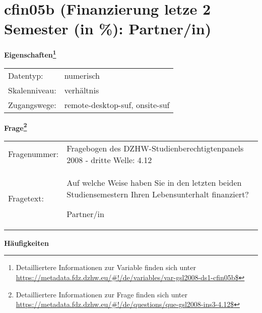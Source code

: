 
    \setcounter{footnote}{0}

    \vspace*{-1.8cm}
	\section{cfin05b (Finanzierung letze 2 Semester (in \%): Partner/in)}
	\label{section:cfin05b}



    \vspace*{0.5cm}
    \noindent\textbf{Eigenschaften\footnote{Detailliertere Informationen zur Variable finden sich unter
		\url{https://metadata.fdz.dzhw.eu/\#!/de/variables/var-gsl2008-ds1-cfin05b$}}}\\
	\begin{tabularx}{\hsize}{@{}lX}
	Datentyp: & numerisch \\
	Skalenniveau: & verhältnis \\
	Zugangswege: &
	  remote-desktop-suf, 
	  onsite-suf
 \\
    \end{tabularx}



				\vspace*{0.5cm}
                \noindent\textbf{Frage\footnote{Detailliertere Informationen zur Frage finden sich unter
		              \url{https://metadata.fdz.dzhw.eu/\#!/de/questions/que-gsl2008-ins3-4.12$}}}\\
				\begin{tabularx}{\hsize}{@{}lX}
					Fragenummer: &
					  Fragebogen des DZHW-Studienberechtigtenpanels 2008 - dritte Welle:
					  4.12
 \\
					Fragetext: & Auf welche Weise haben Sie in den letzten beiden Studiensemestern Ihren Lebensunterhalt finanziert?\par  Partner/in \\
				\end{tabularx}





        		\vspace*{0.5cm}
                \noindent\textbf{Häufigkeiten}

